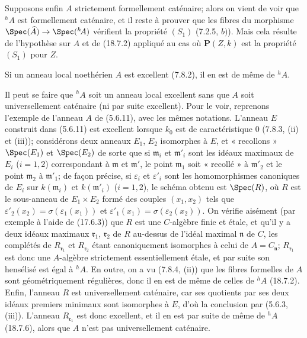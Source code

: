 
Supposons enfin $A$ strictement formellement caténaire; alors on vient de voir que ${}^h\!A$ est formellement caténaire, et il reste à prouver que les fibres du morphisme $\Spec(\widehat A)\to\Spec({}^h\!A)$ vérifient la propriété $(S_1)$ (7.2.5, $b)$). Mais cela résulte de l'hypothèse sur $A$ et de (18.7.2) appliqué au cas où $\mathbf P(Z,k)$ est la propriété $(S_1)$ pour $Z$.

\begin{corollary}[18.7.6]
\label{IV.18.7.6}
Si un anneau local noethérien $A$ est excellent (7.8.2), il en est de même de ${}^h\!A$.
\end{corollary}

\begin{remark}[18.7.7]
\label{IV.18.7.7}
Il peut se faire que ${}^h\!A$ soit un anneau local excellent sans que $A$ soit universellement caténaire (ni par suite excellent). Pour le voir, reprenons l'exemple de l'anneau $A$ de (5.6.11), avec les mêmes notations. L'anneau $E$ construit dans (5.6.11) est excellent lorsque $k_0$ est de caractéristique $0$ (7.8.3, (ii) et (iii)); considérons deux anneaux $E_1$, $E_2$ isomorphes à $E$, et « recollons » $\Spec(E_1)$ et $\Spec(E_2)$ de sorte que si $\mathfrak m_i$ et $\mathfrak m'_i$ sont les idéaux maximaux de $E_i$ ($i=1,2$) correspondant à $\mathfrak m$ et $\mathfrak m'$, le point $\mathfrak m_1$ soit « recollé » à $\mathfrak m'_2$ et le point $\mathfrak m_2$ à $\mathfrak m'_1$; de façon précise, si $\varepsilon_i$ et $\varepsilon'_i$ sont les homomorphismes canoniques de $E_i$ sur $k(\mathfrak m_i)$ et $k(\mathfrak m'_i)$ ($i=1,2$), le schéma obtenu est $\Spec(R)$, où $R$ est le sous-anneau de $E_1\times E_2$ formé des couples $(x_1,x_2)$ tels que $\varepsilon'_2(x_2)=\sigma(\varepsilon_1(x_1))$ et $\varepsilon'_1(x_1)=\sigma(\varepsilon_2(x_2))$. On vérifie aisément (par exemple à l'aide de (17.6.3)) que $R$ est une $C$-algèbre finie et étale, et qu'il y a deux idéaux maximaux $\mathfrak r_1$, $\mathfrak r_2$ de $R$ au-dessus de l'idéal maximal $\mathfrak n$ de $C$, les complétés de $R_{\mathfrak r_1}$ et $R_{\mathfrak r_2}$ étant canoniquement isomorphes à celui de $A=C_{\mathfrak n}$; $R_{\mathfrak r_1}$ est donc une $A$-algèbre strictement essentiellement étale, et par suite son hensélisé est égal à ${}^h\!A$. En outre, on a vu (7.8.4, (ii)) que les fibres formelles de $A$ sont géométriquement régulières, donc il en est de même de celles de ${}^h\!A$ (18.7.2). Enfin, l'anneau $R$ est universellement caténaire, car ses quotients par ses deux idéaux premiers minimaux sont isomorphes à $E$, d'où la conclusion par (5.6.3, (iii)). L'anneau $R_{\mathfrak r_1}$ est donc excellent, et il en est par suite de même de ${}^h\!A$ (18.7.6), alors que $A$ n'est pas universellement caténaire.
\end{remark}

